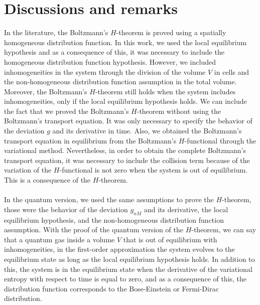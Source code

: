 
\section{Discussions and remarks}\label{sec:disscussion}

In the literature, the Boltzmann's $H$-theorem is proved using a spatially homogeneous distribution function. In this work, we used the local equilibrium hypothesis and as a consequence of this, it was necessary to include the homogeneous distribution function hypothesis. However, we included inhomogeneities in the system through the division of the volume $V$ in cells and the non-homogeneous distribution function assumption in the total volume. Moreover, the Boltzmann's $H$-theorem still holds when the system includes inhomogeneities, only if the local equilibrium hypothesis holds. We can include the fact that we proved the Boltzmann's $H$-theorem without using the Boltzmann's transport equation. It was only necessary to specify the behavior of the deviation $g$ and its derivative in time. Also, we obtained the Boltzmann's transport equation in equilibrium from the Boltzmann's $H$-functional through the variational method. Nevertheless, in order to obtain the complete Boltzmann's transport equation, it was necessary to include the collision term because of the variation of the $H$-functional is not zero when the system is out of equilibrium. This is a consequence of the $H$-theorem.\\
\\
In the quantum version, we used the same assumptions to prove the $H$-theorem, those were the behavior of the deviation $g_{nM}$ and its derivative, the local equilibrium hypothesis, and the non-homogeneous distribution function assumption. With the proof of the quantum version of the $H$-theorem, we can say that a quantum gas inside a volume $V$ that is out of equilibrium with inhomogeneities, in the first-order approximation the system evolves to the equilibrium state as long as the local equilibrium hypothesis holds. In addition to this, the system is in the equilibrium state when the derivative of the variational entropy with respect to time is equal to zero, and as a consequence of this, the distribution function corresponds to the Bose-Einstein or Fermi-Dirac distribution.\\
